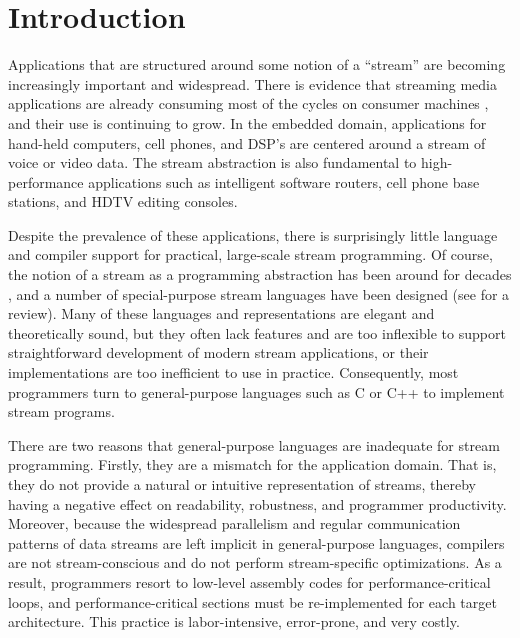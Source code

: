 \section{Introduction}

Applications that are structured around some notion of a ``stream''
are becoming increasingly important and widespread.  There is evidence
that streaming media applications are already consuming most of the
cycles on consumer machines \cite{Rix98}, and their use is continuing
to grow.  In the embedded domain, applications for hand-held
computers, cell phones, and DSP's are centered around a stream of
voice or video data.  The stream abstraction is also fundamental to
high-performance applications such as intelligent software routers,
cell phone base stations, and HDTV editing consoles.

Despite the prevalence of these applications, there is surprisingly
little language and compiler support for practical, large-scale stream
programming.  Of course, the notion of a stream as a programming
abstraction has been around for decades \cite{SICP}, and a number of
special-purpose stream languages have been designed (see
\cite{survey97} for a review).  Many of these languages and
representations are elegant and theoretically sound, but they often
lack features and are too inflexible to support straightforward
development of modern stream applications, or their implementations
are too inefficient to use in practice.  Consequently, most
programmers turn to general-purpose languages such as C or C++ to
implement stream programs.

There are two reasons that general-purpose languages are inadequate
for stream programming.  Firstly, they are a mismatch for the
application domain.  That is, they do not provide a natural or
intuitive representation of streams, thereby having a negative effect
on readability, robustness, and programmer productivity.  Moreover,
because the widespread parallelism and regular communication patterns
of data streams are left implicit in general-purpose languages,
compilers are not stream-conscious and do not perform stream-specific
optimizations.  As a result, programmers resort to low-level assembly
codes for performance-critical loops, and performance-critical
sections must be re-implemented for each target architecture.  This
practice is labor-intensive, error-prone, and very costly.

